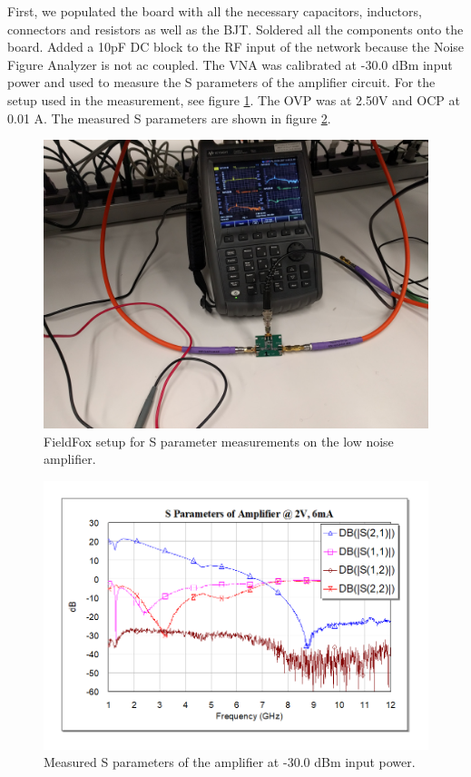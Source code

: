 \documentclass[twocolumn, aps, floatfix]{revtex4-1}
\begin{document}
First, we populated the board with all the necessary capacitors, inductors, connectors and resistors as well as the BJT. Soldered all the components onto the board. Added a 10pF DC block to the RF input of the network because the Noise Figure Analyzer is not ac coupled. The VNA was calibrated at -30.0 dBm input power and used to measure the S parameters of the amplifier circuit. For the setup used in the measurement, see figure \ref{fig:ampimg}. The OVP was at 2.50V and OCP at 0.01 A. The measured S parameters are shown in figure \ref{fig:ampSparams}.

    \begin{figure}[!htbp]
    \centering
    \includegraphics[scale=0.05]{LNA_1.jpg}
    \caption{FieldFox setup for S parameter measurements on the low noise amplifier.}
    \label{fig:ampimg}
    \end{figure}

    \begin{figure}[!htbp]
    \centering
    \includegraphics[scale=0.4]{amp_S_params.png}
    \caption{Measured S parameters of the amplifier at -30.0 dBm input power.}
    \label{fig:ampSparams}
    \end{figure}
\end{document}

